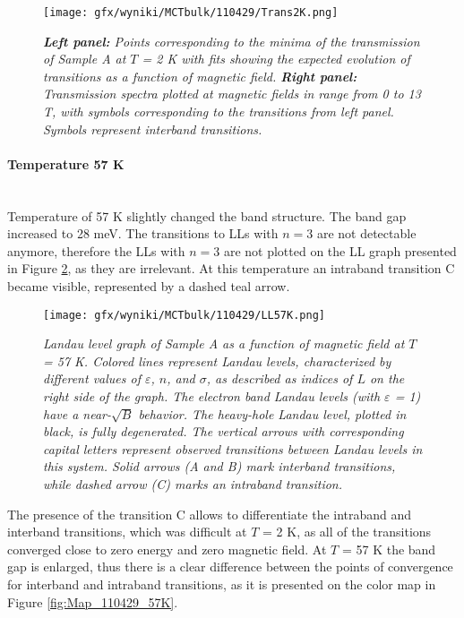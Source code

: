 \documentclass[titlepage,a4paper]{book}
\newcommand{\wciecie}{\quad\phantom{v}}
\newcommand{\myparagraph}[1]{\paragraph{#1}\mbox{}\\}
\begin{document}
\begin{figure}[H]
	\centering
	\texttt{[image: gfx/wyniki/MCTbulk/110429/Trans2K.png]}
	\vspace{-10pt}
	\caption{\textit{\textbf{Left panel:} Points corresponding to the minima of the transmission of Sample A at $T$ = 2 K with fits showing the expected evolution of transitions as a function of magnetic field. \textbf{Right panel:} Transmission spectra plotted at magnetic fields in range from 0 to 13 T, with symbols corresponding to the transitions from left panel. Symbols represent interband transitions.}}
	\label{fig:Spectra_110429_2K}
\end{figure} 


\myparagraph{Temperature 57 K}
\wciecie
Temperature of 57 K slightly changed the band structure. The band gap increased to 28 meV. The transitions to LLs with $n = 3$ are not detectable anymore, therefore the LLs with $n = 3$ are not plotted on the LL graph presented in Figure \ref{fig:LL_110429_57K}, as they are irrelevant. At this temperature an intraband transition C became visible, represented by a dashed teal arrow.

\begin{figure}[ht]
	\centering
	\texttt{[image: gfx/wyniki/MCTbulk/110429/LL57K.png]}
	\vspace{-10pt}
	\caption{\textit{Landau level graph of Sample A as a function of magnetic field at $T$ = 57 K. Colored lines represent Landau levels, characterized by different values of $\varepsilon$, $n$, and $\sigma$, as described as indices of $L$ on the right side of the graph. The electron band Landau levels (with $\varepsilon$ = 1) have a near-$\sqrt{B}$ behavior. The heavy-hole Landau level, plotted in black, is fully degenerated. The vertical arrows with corresponding capital letters represent observed transitions between Landau levels in this system. Solid arrows (A and B) mark interband transitions, while dashed arrow (C) marks an intraband transition.}} 
	\label{fig:LL_110429_57K}
\end{figure}

The presence of the transition C allows to differentiate the intraband and interband transitions, which was difficult at $T$ = 2 K, as all of the transitions converged close to zero energy and zero magnetic field. At $T$ = 57 K the band gap is enlarged, thus there is a clear difference between the points of convergence for interband and intraband transitions, as it is presented on the color map in Figure \ref{fig:Map_110429_57K}.
 
\end{document}

